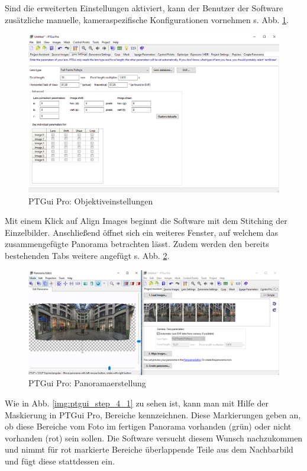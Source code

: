 \documentclass[liststotoc,bibtotoc,fontsize=14pt,]{scrreprt}
\begin{document}
	\bigskip
	Sind die erweiterten Einstellungen aktiviert, kann der Benutzer der Software zusätzliche manuelle, kameraspezifische Konfigurationen vornehmen s. Abb. \ref{img:ptgui_step_3}.
	\begin{figure}[H]
		\includegraphics[width=\linewidth]{img/steps/PTGui_Step_3.PNG}
		\caption{PTGui Pro: Objektiveinstellungen}
		\label{img:ptgui_step_3}
	\end{figure}
	\bigskip
	Mit einem Klick auf \grqq{}Align Images\grqq{} beginnt die Software mit dem Stitching der Einzelbilder. Anschließend öffnet sich ein weiteres Fenster, auf welchem das zusammengefügte Panorama betrachten lässt. Zudem werden den bereits bestehenden Tabs weitere angefügt s. Abb. \ref{img:ptgui_step_4}. 
	\begin{figure}[H]
		\includegraphics[width=\linewidth]{img/steps/PTGui_Step_4.PNG}
		\caption{PTGui Pro: Panoramaerstellung}
		\label{img:ptgui_step_4}
	\end{figure}
	\bigskip
	Wie in Abb. \ref{img:ptgui_step_4_1} zu sehen ist, kann man mit Hilfe der Maskierung in PTGui Pro, Bereiche kennzeichnen. Diese Markierungen geben an, ob diese Bereiche vom Foto im fertigen Panorama vorhanden (grün) oder nicht  vorhanden (rot) sein sollen. Die Software versucht diesem Wunsch nachzukommen und nimmt für rot markierte Bereiche überlappende Teile aus dem Nachbarbild und fügt diese stattdessen ein.
\end{document}
